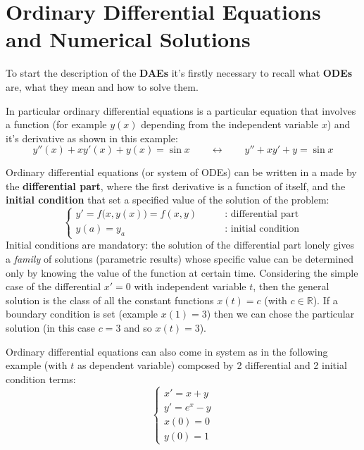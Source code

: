 \chapter{Ordinary Differential Equations and Numerical Solutions}
	To start the description of the \textbf{DAEs} it's firstly necessary to recall what  \textbf{ODEs} are, what they mean and how to solve them.
	
	In particular ordinary differential equations is a particular equation that involves a function (for example $y(x)$ depending from the independent variable $x$) and it's derivative as shown in this example:
	\[ y''(x) + x y'(x) + y(x) = \sin x \qquad \leftrightarrow \qquad y'' + xy' + y = \sin x \]
	
	Ordinary differential equations (or system of ODEs) can be written in a  made by the \textbf{differential part}, where the first derivative is a function of itself, and the \textbf{initial condition} that set a specified value of the solution of the problem:
	\begin{equation} \label{eq:ode:temp1}
	\begin{cases}
		y' = f\big(x,y(x)\big) = f(x,y) \qquad & \text{: differential part} \\
		y(a) = y_a & \text{: initial condition}
	\end{cases}
	\end{equation}
	Initial conditions are mandatory: the solution of the differential part lonely gives a \textit{family} of solutions (parametric results) whose specific value can be determined only by knowing the value of the function at certain time. Considering the simple case of the differential $x' = 0$ with independent variable $t$, then the general solution is the class of all the constant functions $x(t) = c$ (with $c\in \mathds R$). If a boundary condition is set (example $x(1) = 3$) then we can chose the particular solution (in this case $c = 3$ and so $x(t) = 3$).
	
	Ordinary differential equations can also come in system as in the following example (with $t$ as dependent variable) composed by 2 differential and 2 initial condition terms:
	\[\begin{cases}
		x' = x + y \\ y' = e^x-y \\ x(0) = 0 \\ y(0) = 1
	\end{cases}\]
	
